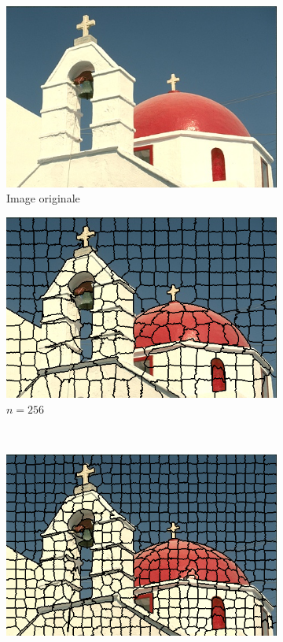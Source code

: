 \documentclass[12pt]{article}
\begin{document}
\begin{figure}
  \begin{subfigure}{0.49\textwidth}
    \centering
    \includegraphics[width=1\textwidth]{church/church.png}
    \caption{Image originale}
  \end{subfigure}
  \begin{subfigure}{0.49\textwidth}
    \centering
    \includegraphics[width=1\textwidth]{church/church_segmented_256.png}
    \caption{$n=256$}
  \end{subfigure} \\
  \begin{subfigure}{0.49\textwidth}
    \centering
    \includegraphics[width=1\textwidth]{church/church_segmented_512.png}

\end{subfigure}
\end{figure}
\end{document}
